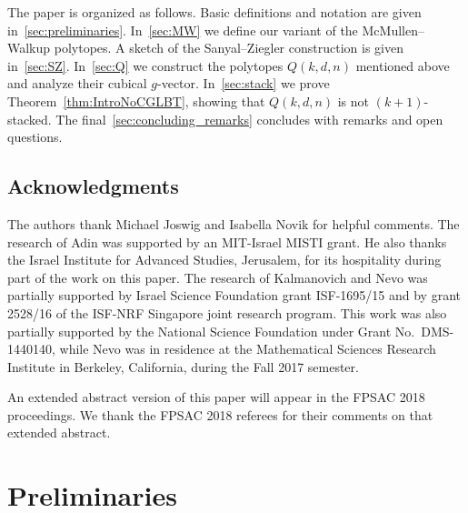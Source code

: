 \documentclass[a4paper,leqno]{article}
\theoremstyle{definition}
\begin{document}

The paper is organized as follows. Basic definitions and notation are given in~\autoref{sec:preliminaries}. In~\autoref{sec:MW} we define our variant of the McMullen--Walkup polytopes. A sketch of the Sanyal--Ziegler construction is given in~\autoref{sec:SZ}. In~\autoref{sec:Q} we construct the polytopes $Q(k,d,n)$ mentioned above and analyze their cubical $g$-vector. In~\autoref{sec:stack} we prove Theorem~\ref{thm:IntroNoCGLBT}, showing that $Q(k,d,n)$ is not $(k+1)$-stacked. The final~\autoref{sec:concluding_remarks} concludes with remarks and open questions.


\subsection*{Acknowledgments}

The authors thank Michael Joswig and Isabella Novik for helpful comments.
The research of Adin was supported by an MIT-Israel MISTI grant. He also thanks the Israel Institute for Advanced Studies, Jerusalem, for its hospitality during part of the work on this paper.
The research of Kalmanovich and Nevo was partially supported by Israel Science Foundation grant ISF-1695/15 and by grant 2528/16 of the ISF-NRF Singapore joint research program.
This work was also partially supported by the National Science Foundation under Grant No.\ DMS-1440140, while Nevo was in residence at the Mathematical Sciences Research Institute in Berkeley, California, during the Fall 2017 semester.

An extended abstract version of this paper will appear in the FPSAC 2018 proceedings. We thank the FPSAC 2018 referees for their comments on that extended abstract.


\section{Preliminaries}\label{sec:preliminaries}
\end{document}
